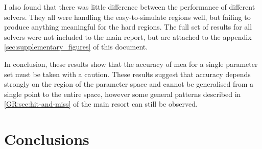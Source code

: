 I also found that there was little difference between the performance of different solvers. They all were handling the easy-to-simulate regions well, but failing to produce anything meaningful for the hard regions.
The full set of results for all solvers were not included to the main report, but are attached to the appendix \autoref{sec:supplementary_figures} of this document.

In conclusion, these results show that the accuracy of \gls{mea} for a single parameter set must be taken with a caution. These results suggest that accuracy depends strongly on the region of the parameter space and cannot be generalised from a single point to the entire space, however some general patterns described in \autoref*{GR:sec:hit-and-miss} of the main resort can still be observed.

\section{Conclusions}

